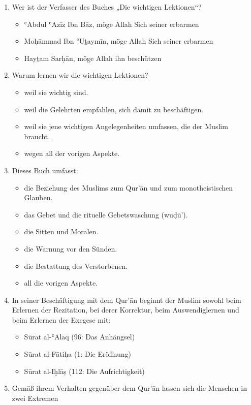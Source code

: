 \begin{enumerate}[leftmargin=1.6em]
\item Wer ist der Verfasser des Buches „Die wichtigen Lektionen“?
  \begin{itemize}
    \item ʿAbdul ʿAzīz Ibn Bāz, möge Allah Sich seiner erbarmen
    \item Moḥāmmad Ibn ʿUṯaymīn, möge Allah Sich seiner erbarmen
    \item Hayṯam Sarḥān, möge Allah ihn beschützen
  \end{itemize}
\item Warum lernen wir die wichtigen Lektionen?
  \begin{itemize}
    \item weil sie wichtig sind.
    \item weil die Gelehrten empfahlen, sich damit zu beschäftigen.
    \item weil sie jene wichtigen Angelegenheiten umfassen, die der Muslim braucht.
    \item wegen all der vorigen Aspekte.
  \end{itemize}
\item Dieses Buch umfasst:
  \begin{itemize}
    \item die Beziehung des Muslims zum Qur’ān und zum monotheistischen Glauben.
    \item das Gebet und die rituelle Gebetswaschung (wuḍū’).
    \item die Sitten und Moralen.
    \item die Warnung vor den Sünden.
    \item die Bestattung des Verstorbenen.
    \item all die vorigen Aspekte.
  \end{itemize}
\item In seiner Beschäftigung mit dem Qur’ān beginnt der Muslim sowohl beim Erlernen der
  Rezitation, bei derer Korrektur, beim Auswendiglernen und beim Erlernen der Exegese mit:
  \begin{itemize}
    \item Sūrat al-ʿAlaq (96: Das Anhängsel)
    \item Sūrat al-Fātiḥa (1: Die Eröffnung)
    \item Sūrat al-Iḫlāṣ (112: Die Aufrichtigkeit)
  \end{itemize}
\item Gemäß ihrem Verhalten gegenüber dem Qur’ān lassen sich die Menschen in zwei Extremen

\end{enumerate}
